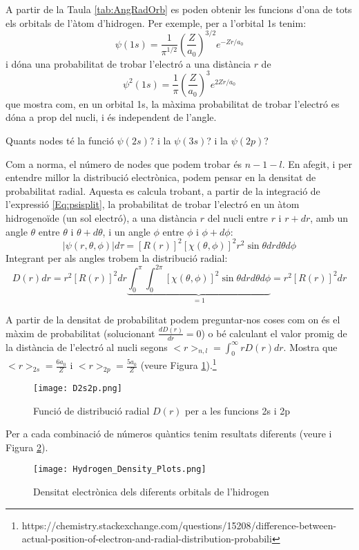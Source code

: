 A partir de la Taula \ref{tab:AngRadOrb} es poden obtenir les funcions d'ona de tots els orbitals de l'àtom d'hidrogen. Per exemple, per a l'orbital 1s tenim:
\[
\psi(1s)= \frac{1}{\pi^{1/2}} \left( \frac{Z}{a_0} \right)^{3/2} e^{-Zr/a_0}
\]
i dóna una probabilitat de trobar l'electró a una distància $r$ de
\[
\psi^2(1s)= \frac{1}{\pi} \left( \frac{Z}{a_0} \right)^{3} e^{2Zr/a_0}
\]
que mostra com, en un orbital 1s, la màxima probabilitat de trobar l'electró es dóna a prop del nucli, i és independent de l'angle. 

\begin{exr}
Quants nodes té la funció $\psi(2s)$? i la $\psi(3s)$? i la $\psi(2p)$? 
\end{exr}
Com a norma, el número de nodes que podem trobar és $n-1-l$. 
En afegit, i per entendre millor la distribució electrònica, podem pensar en la densitat de probabilitat radial.
Aquesta es calcula trobant, a partir de la integració de l'expressió \ref{Eq:psisplit}, la probabilitat de trobar l'electró en un àtom hidrogenoïde (un sol electró), a una distància $r$ del nucli entre $r$ i $r+dr$, amb un angle $\theta$ entre $\theta$ i $\theta+d\theta$, i un angle $\phi$ entre $\phi$ i $\phi+d\phi$:
\[
|\psi(r,\theta,\phi)| d\tau = [R(r)]^2 [\chi(\theta,\phi)]^2 r^2 \sin \theta dr d\theta d\phi
\]
Integrant per als angles trobem la distribució radial:
\[
D(r)dr=r^2[R(r)]^2 dr \underbrace{\int_0^{\pi} \int_0^{2\pi} [\chi(\theta,\phi)]^2 \sin \theta dr d\theta d\phi}_{=1}=r^2[R(r)]^2 dr
\]
\begin{exr}
A partir de la densitat de probabilitat podem preguntar-nos coses com on és el màxim de probabilitat (solucionant  $\frac{d D(r)}{dr}=0$) o bé calculant el valor promig de la distància de l'electró al nucli segons $<r>_{n,l}=\int_0^{\infty} r D(r)dr$. Mostra que $<r>_{2s}=\frac{6a_0}{Z}$ i $<r>_{2p}=\frac{5a_0}{Z}$ (veure Figura \ref{fig:D2s2p}).\footnote{https://chemistry.stackexchange.com/questions/15208/difference-between-actual-position-of-electron-and-radial-distribution-probabili}
\end{exr}
\begin{figure}[h]
\centering
\texttt{[image: D2s2p.png]}
\caption{Funció de distribució radial $D(r)$ per a les funcions 2s i 2p}
\label{fig:D2s2p}
\end{figure}
Per a cada combinació de números quàntics tenim resultats diferents (veure  i Figura \ref{fig:Hydrogen_Density_Plots}).


\begin{figure}[h]
\centering
\texttt{[image: Hydrogen\_Density\_Plots.png]}
\caption{Densitat electrònica dels diferents orbitals de l'hidrogen}
\label{fig:Hydrogen_Density_Plots}
\end{figure}



